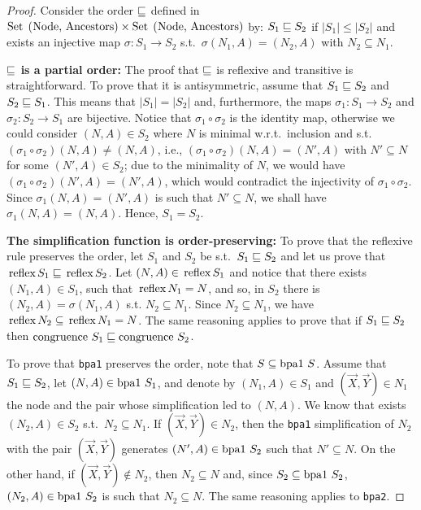 \begin{proof}
	Consider the order 
	$\sqsubseteq$ defined in $\text{\lstinline{Set (Node, Ancestors)}}
	\times \text{\lstinline{Set (Node, Ancestors)}}$ by:
	$S_1 \sqsubseteq S_2$ if $|S_1| \leq |S_2|$ and
	exists an injective map $\sigma : S_1 \rightarrow S_2$ s.t.\  
	$\sigma(N_1,A) = (N_2,A)$ with $N_2\subseteq N_1$.\smallskip
	
	\noindent\textbf{$\sqsubseteq$ is a partial order:} The proof that
	$\sqsubseteq$ is reflexive and transitive is straightforward. 
	To prove that it is 
	antisymmetric, assume that $S_1\sqsubseteq S_2$ and $S_2 \sqsubseteq S_1$.
	This means that $|S_1|=|S_2|$ and, furthermore, the maps 
	$\sigma_1 : S_1 \rightarrow S_2$ and $\sigma_2 : S_2 \rightarrow S_1$
	are bijective. Notice that $\sigma_1\circ \sigma_2$  
	is the identity map, otherwise we could consider $(N,A)\in S_2$
	where $N$ is minimal w.r.t.\ inclusion and s.t.\
	$(\sigma_1\circ \sigma_2)(N,A) \neq (N,A)$, i.e.,
	$(\sigma_1\circ \sigma_2)(N,A) = (N',A)$ with $N'\subseteq N$ 
	for some $(N',A)\in S_2$;
	due to the minimality of $N$, we would have 
	$(\sigma_1\circ \sigma_2)(N',A) = (N',A)$, which would contradict the
	injectivity of $\sigma_1\circ \sigma_2$. Since
	$\sigma_1 (N,A) = (N',A)$ is such that $N'\subseteq N$, we shall 
	have $\sigma_1 (N,A) = (N,A)$. Hence, $S_1=S_2$.\smallskip
	
	\noindent\textbf{The simplification function is order-preserving:}
	To prove that the reflexive rule preserves the order, let $S_1$ and 
	$S_2$ be s.t.\ $S_1\sqsubseteq S_2$ and let us prove that 
	$\text{\lstinline{reflex}} S_1\leqSets\text{\lstinline{reflex}}S_2$.
	Let $(N,A)\in \text{\lstinline{reflex}} S_1$
	and notice that there exists $(N_1,A)\in S_1$, such that
	$\text{\lstinline{reflex}} N_1 = N $, and so,
	in $S_2$ there is $(N_2,A)=\sigma(N_1,A)$ s.t. $N_2\subseteq N_1$. 
	Since $N_2\subseteq N_1$, we have
	$\text{\lstinline{reflex}} N_2 \subseteq
    \text{\lstinline{reflex}} N_1 = N$.
	The same reasoning applies to prove that if $S_1\sqsubseteq S_2$ then 
	$\text{\lstinline{congruence} } S_1\leqSets\text{\lstinline{congruence} }S_2$.
	
	To prove that \lstinline{bpa1} preserves the order,
	note that 
	$S \subseteq \text{\lstinline{bpa1} }S$. Assume that 
	$S_1\sqsubseteq S_2$, let $(N,A)\in \text{\lstinline{bpa1} }S_1$, 
	and denote by $(N_1,A)\in S_1$ and $(\vec X,\vec Y)\in N_1$  
	the node and the pair whose simplification 
	led to $(N,A)$. We know that exists $(N_2,A)\in S_2$
	s.t.\ $N_2 \subseteq N_1$. If $(\vec X,\vec Y)\in N_2$,
	then the \lstinline{bpa1} simplification of $N_2$ with
	the pair $(\vec X,\vec Y)$ generates 
	$(N',A)\in \text{\lstinline{bpa1} }S_2$ such that 
	$N'\subseteq N$. On the other hand, if 
	$(\vec X,\vec Y)\not \in N_2$, then $N_2\subseteq N$ 
	and, since  $S_2 \subseteq \text{\lstinline{bpa1} }S_2$,
	$(N_2,A)\in \text{\lstinline{bpa1} }S_2$ is such that
	$N_2\subseteq N$.
	The same reasoning applies to \lstinline{bpa2}. 
	

\end{proof}
